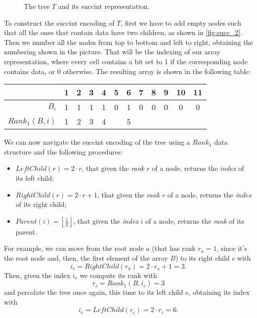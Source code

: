\begin{figure}[H]
\caption{The tree $T$ and its succint representation.}
\label{fig:succ_0}
\end{figure}

To construct the succint encoding of $T$, first we have to add empty nodes such
that all the ones that contain data have two children, as shown in
\autoref{fig:succ_2}. Then we number all the nodes from top to bottom and left
to right, obtaining the numbering shown in the picture. That will be the
indexing of our array representation, where every cell contains a bit set to 1
if the corresponding node contains data, or 0 otherwise. The resulting array is
shown in the following table:
%
\begin{center}
  \begin{tabular}{r|c|c|c|c|c|c|c|c|c|c|c}
                   & 1 & 2 & 3 & 4 & 5 & 6 & 7 & 8 & 9 & 10 & 11 \\ \hline
    $B_i$          & 1 & 1 & 1 & 1 & 0 & 1 & 0 & 0 & 0 &  0 &  0 \\
    $Rank_1(B, i)$ & 1 & 2 & 3 & 4 &   & 5 &   &   &   &    &    \\
  \end{tabular}
\end{center}

We can now navigate the succint encoding of the tree using a $Rank_1$ data
structure and the following procedures:
%
\begin{itemize}

  \item $LeftChild(r) = 2 \cdot r$, that given the \emph{rank} $r$ of a node, returns
  the \emph{index} of its left child;

  \item $RightChild(r) = 2 \cdot r + 1$, that given the \emph{rank} $r$ of a node,
  returns the \emph{index} of its right child;

  \item $Parent(i) = \left\lfloor \frac{i}{2} \right\rfloor$, that given the
  \emph{index} $i$ of a node, returns the \emph{rank} of its parent.

\end{itemize}

For example, we can move from the root node $a$ (that has rank $r_a = 1$, since
it's the root node and, then, the first element of the array $B$) to its right
child $c$ with $$i_c = RightChild(r_a) = 2 \cdot r_a + 1 = 3.$$ Then, given the
index $i_c$ we compute its rank with $$r_c = Rank_1(B, i_c) = 3$$ and percolate
the tree once again, this time to its left child $e$, obtaining its index with
$$i_e = LeftChild(r_c) = 2 \cdot r_c = 6.$$
